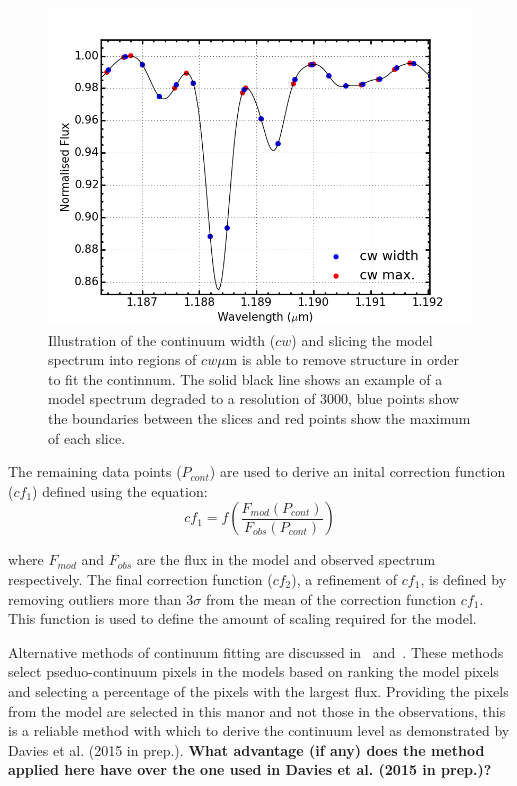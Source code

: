 \documentclass[12pt]{article}
\begin{document}
\begin{figure}
 \centering
\includegraphics[width=\textwidth]{cw}
\caption{
Illustration of the continuum width ($cw$) and slicing the model spectrum into regions of $cw\mu$m is able to remove structure in order to fit the continnum.
The solid black line shows an example of a model spectrum degraded to a resolution of 3000,
blue points show the boundaries between the slices and red points show the maximum of each slice.\label{fig:cw}
         }
\end{figure}



The remaining data points ($P_{cont}$) are used to derive an inital correction function
($cf_{1}$) defined using the equation:
\begin{equation}
    cf_{1} = f(\frac{F_{mod}(P_{cont})}{F_{obs}(P_{cont})})
\end{equation}

\noindent where $F_{mod}$ and $F_{obs}$ are the flux in the model and observed spectrum respectively.
The final correction function ($cf_{2}$), a refinement of $cf_{1}$,
is defined by removing outliers more than 3$\sigma$ from the mean of the correction function $cf_{1}$.
This function is used to define the amount of scaling required for the model.



Alternative methods of continuum fitting are discussed in~\cite{2010MNRAS.407.1203D} and~\cite{2011A&A...527A..50E}.
These methods select pseduo-continuum pixels in the models based on ranking the model pixels and selecting a percentage of the pixels with the largest flux.
Providing the pixels from the model are selected in this manor and not those in the observations, this is a reliable method with which to derive the continuum level as demonstrated by Davies et al. (2015 in prep.).
\textbf{What advantage (if any) does the method applied here have over the one used in Davies et al. (2015 in prep.)?}
\end{document}
